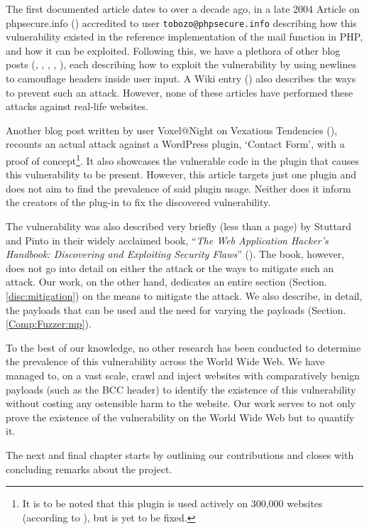 The first documented article dates to over a decade ago, in a late 2004 Article on phpsecure.info (\cite{Tobozo}) accredited to user \lstinline|tobozo@phpsecure.info| describing how this vulnerability existed in the reference implementation of the mail function in PHP, and how it can be exploited. Following this, we have a plethora of other blog posts (\cite{Nicol}, \cite{DK}, \cite{Pope}, \cite{Calin}, \cite{Injection2}), each describing how to exploit the vulnerability by using newlines to camouflage headers inside user input. A Wiki entry (\cite{Injection}) also describes the ways to prevent such an attack. However, none of these articles have performed these attacks against real-life websites.

Another blog post written by user Voxel@Night on Vexatious Tendencies (\cite{Tendencies2014}), recounts an actual attack against a WordPress plugin, `Contact Form', with a proof of concept\footnote{It is to be noted that this plugin is used actively on 300,000 websites (according to \cite{BestWebSoft2016}), but is yet to be fixed.}. It also showcases the vulnerable code in the plugin that causes this vulnerability to be present. However, this article targets just one plugin and does not aim to find the prevalence of said plugin usage. Neither does it inform the creators of the plug-in to fix the discovered vulnerability.

The vulnerability was also described very briefly (less than a page) by Stuttard and Pinto in their widely acclaimed book, ``\emph{The Web Application Hacker's Handbook: Discovering and Exploiting Security Flaws}'' (\cite{stuttard2011web}). The book, however, does not go into detail on either the attack or the ways to mitigate such an attack. Our work, on the other hand, dedicates an entire section (Section. \ref{disc:mitigation}) on the means to mitigate the attack. We also describe, in detail, the payloads that can be used and the need for varying the payloads (Section. \ref{Comp:Fuzzer:mp}).

To the best of our knowledge, no other research has been conducted to determine the prevalence of this vulnerability across the World Wide Web. We have managed to,  on a vast scale, crawl and inject websites with comparatively benign payloads (such as the BCC header) to identify the existence of this vulnerability without costing any ostensible harm to the website. Our work serves to not only prove the existence of the vulnerability on the World Wide Web but to quantify it.

The next and final chapter starts by outlining our contributions and closes with concluding remarks about the project.